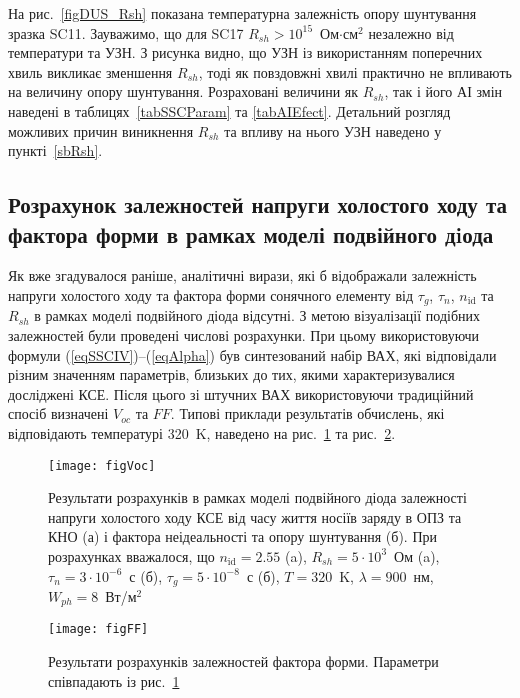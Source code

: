 На рис.~\ref{figDUS_Rsh} показана температурна залежність  опору шунтування зразка SC11.
Зауважимо, що для SC17 $R_{sh}>10^{15}$~Ом$\cdot$см$^2$ незалежно від температури та УЗН.
З рисунка видно, що УЗН із використанням поперечних хвиль викликає зменшення $R_{sh}$,
тоді як повздовжні хвилі практично не впливають на величину  опору шунтування.
Розраховані величини як $R_{sh}$, так і його АІ змін наведені в таблицях~\ref{tabSSCParam} та \ref{tabAIEfect}.
Детальний розгляд можливих причин виникнення $R_{sh}$ та впливу на нього УЗН наведено у пункті~\ref{sbRsh}.


\subsection{Розрахунок залежностей напруги холостого ходу та фактора форми в рамках моделі подвійного дiода\label{sbVocSim}}


Як вже згадувалося раніше,
аналітичні вирази, які б відображали залежність напруги холостого ходу та фактора форми сонячного елементу
від $\tau_g$, $\tau_n$, $n_{\mathrm{id}}$ та $R_{sh}$ в рамках  моделі подвійного діода відсутні.
З метою візуалізації подібних залежностей були проведені числові розрахунки.
При цьому використовуючи
формули (\ref{eqSSCIV})--(\ref{eqAlpha}) був синтезований набір ВАХ, які відповідали різним
значенням параметрів, близьких
до тих, якими характеризувалися досліджені КСЕ.
Після цього зі штучних ВАХ використовуючи традиційний спосіб визначені $V_{oc}$ та $F\!F$.
Типові приклади результатів обчислень, які відповідають температурі 320~K, наведено на рис.~\ref{figVoc} та рис.~\ref{figFF}.


\begin{figure}
\center
\texttt{[image: figVoc]}
\caption{\label{figVoc}
Результати розрахунків
в рамках моделі подвійного діода залежності напруги холостого ходу КСЕ від часу життя носіїв заряду в ОПЗ та КНО (а) і
фактора неідеальності та  опору шунтування (б).
При розрахунках вважалося, що $n_\mathrm{id}=2.55$ (a), $R_{sh}=5\cdot10^3$~Ом (a), $\tau_n=3\cdot10^{-6}$~с (б), $\tau_g=5\cdot10^{-8}$~с (б), $T=320$~K, $\lambda=900$~нм, $W_{ph}=8$~Вт/м$^2$
}%
\end{figure}


\begin{figure}[b]
\center
\texttt{[image: figFF]}
\caption{\label{figFF}
Результати розрахунків залежностей фактора форми.
Параметри співпадають із рис.~\ref{figVoc}
}%
\end{figure}

